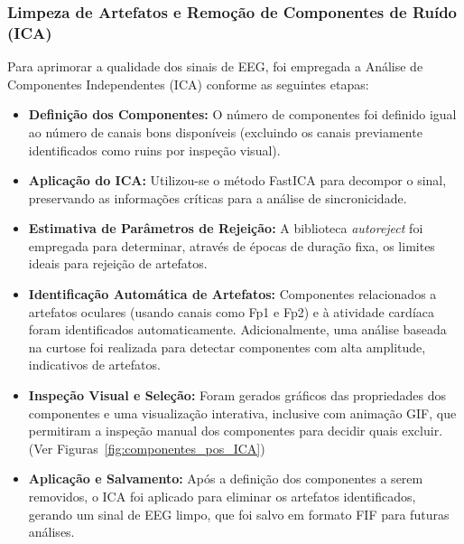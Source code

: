 \subsubsection{Limpeza de Artefatos e Remoção de Componentes de Ruído (ICA)}

Para aprimorar a qualidade dos sinais de EEG, foi empregada a Análise de Componentes Independentes (ICA) conforme as seguintes etapas:
\begin{itemize}
    \item \textbf{Definição dos Componentes:} O número de componentes foi definido igual ao número de canais bons disponíveis (excluindo os canais previamente identificados como ruins por inspeção visual).
    \item \textbf{Aplicação do ICA:} Utilizou-se o método FastICA para decompor o sinal, preservando as informações críticas para a análise de sincronicidade.
    \item \textbf{Estimativa de Parâmetros de Rejeição:} A biblioteca \textit{autoreject} foi empregada para determinar, através de épocas de duração fixa, os limites ideais para rejeição de artefatos.
    \item \textbf{Identificação Automática de Artefatos:} Componentes relacionados a artefatos oculares (usando canais como Fp1 e Fp2) e à atividade cardíaca foram identificados automaticamente. Adicionalmente, uma análise baseada na curtose foi realizada para detectar componentes com alta amplitude, indicativos de artefatos.
    \item \textbf{Inspeção Visual e Seleção:} Foram gerados gráficos das propriedades dos componentes e uma visualização interativa, inclusive com animação GIF, que permitiram a inspeção manual dos componentes para decidir quais excluir. (Ver Figuras~\ref{fig:componentes_pos_ICA})
    \item \textbf{Aplicação e Salvamento:} Após a definição dos componentes a serem removidos, o ICA foi aplicado para eliminar os artefatos identificados, gerando um sinal de EEG limpo, que foi salvo em formato FIF para futuras análises.
\end{itemize}

